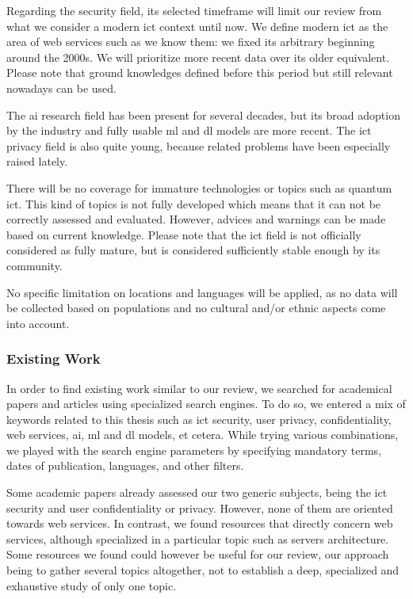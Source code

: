 Regarding the security field, its selected timeframe will limit our review from what we consider a modern \gls{ict} context until now. We define modern \gls{ict} as the area of web services such as we know them: we fixed its arbitrary beginning around the 2000s. We will prioritize more recent data over its older equivalent. Please note that ground knowledges defined before this period but still relevant nowadays can be used. 

The \gls{ai} research field has been present for several decades, but its broad adoption by the industry and fully usable \gls{ml} and \gls{dl} models are more recent. The \gls{ict} privacy field is also quite young, because related problems have been especially raised lately.

There will be no coverage for immature technologies or topics such as quantum \gls{ict}. This kind of topics is not fully developed which means that it can not be correctly assessed and evaluated. However, advices and warnings can be made based on current knowledge. Please note that the \gls{ict} field is not officially considered as fully mature, but is considered sufficiently stable enough by its community.

No specific limitation on locations and languages will be applied, as no data will be collected based on populations and no cultural and/or ethnic aspects come into account.

\subsubsection{Existing Work}
\label{subsubsec:state_methodology_approach_existing}

In order to find existing work similar to our review, we searched for academical papers and articles using specialized search engines. To do so, we entered a mix of keywords related to this thesis such as \gls{ict} security, user privacy, confidentiality, web services, \gls{ai}, \gls{ml} and \gls{dl} models, et cetera. While trying various combinations, we played with the search engine parameters by specifying mandatory terms, dates of publication, languages, and other filters.

Some academic papers already assessed our two generic subjects, being the \gls{ict} security and user confidentiality or privacy. However, none of them are oriented towards web services. In contrast, we found resources that directly concern web services, although specialized in a particular topic such as servers architecture. Some resources we found could however be useful for our review, our approach being to gather several topics altogether, not to establish a deep, specialized and exhaustive study of only one topic.


